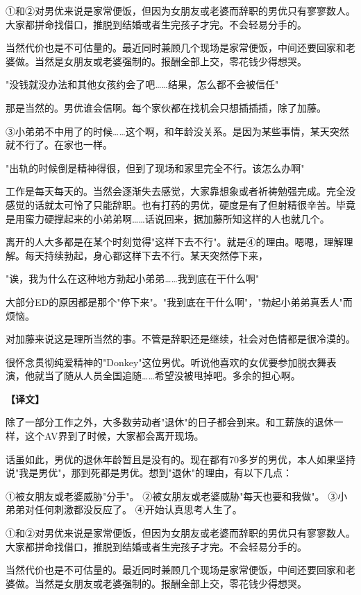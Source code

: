\documentclass[12pt,UTF8]{ctexbook}
\begin{document}
{{①和②对男优来说是家常便饭，但因为女朋友或老婆而辞职的男优只有寥寥数人。大家都拼命找借口，推脱到结婚或者生完孩子才完。不会轻易分手的。

当然代价也是不可估量的。最近同时兼顾几个现场是家常便饭，中间还要回家和老婆做。当然是女朋友或老婆强制的。报酬全部上交，零花钱少得想哭。

"没钱就没办法和其他女孩约会了吧……结果，怎么都不会被信任"

那是当然的。男优谁会信啊。每个家伙都在找机会只想插插插，除了加藤。

③小弟弟不中用了的时候……这个啊，和年龄没关系。是因为某些事情，某天突然就不行了。在家也一样。

"出轨的时候倒是精神得很，但到了现场和家里完全不行。该怎么办啊"

工作是每天每天的。当然会逐渐失去感觉，大家靠想象或者祈祷勉强完成。完全没感觉的话就太可怜了只能辞职。也有打药的男优，硬度是有了但射精很辛苦。毕竟是用蛮力硬撑起来的小弟弟啊……话说回来，据加藤所知这样的人也就几个。

离开的人大多都是在某个时刻觉得"这样下去不行"。就是④的理由。嗯嗯，理解理解。每天持续勃起，身心都这样下去不行。某天突然停下来，

"诶，我为什么在这种地方勃起小弟弟……我到底在干什么啊"

大部分ED的原因都是那个"停下来"。"我到底在干什么啊"，"勃起小弟弟真丢人"而烦恼。

对加藤来说这是理所当然的事。不管是辞职还是继续，社会对色情都是很冷漠的。

很怀念贯彻纯爱精神的"Donkey"这位男优。听说他喜欢的女优要参加脱衣舞表演，他就当了随从人员全国追随……希望没被甩掉吧。多余的担心啊。
}

\vspace{2ex}
\parbox{0.9\linewidth}{
\textbf{【译文】}\par

除了一部分工作之外，大多数劳动者"退休"的日子都会到来。和工薪族的退休一样，这个AV界到了时候，大家都会离开现场。

话虽如此，男优的退休年龄暂且是没有的。现在都有70多岁的男优，本人如果坚持说"我是男优"，那到死都是男优。想到"退休"的理由，有以下几点：

①被女朋友或老婆威胁"分手"。
②被女朋友或老婆威胁"每天也要和我做"。
③小弟弟对任何刺激都没反应了。
④开始认真思考人生了。

①和②对男优来说是家常便饭，但因为女朋友或老婆而辞职的男优只有寥寥数人。大家都拼命找借口，推脱到结婚或者生完孩子才完。不会轻易分手的。

当然代价也是不可估量的。最近同时兼顾几个现场是家常便饭，中间还要回家和老婆做。当然是女朋友或老婆强制的。报酬全部上交，零花钱少得想哭。

}}
\end{document}
